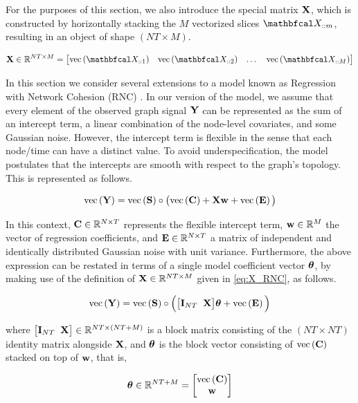 For the purposes of this section, we also introduce the special matrix $\mathbf{X}$, which is constructed by horizontally stacking the $M$ vectorized slices $\Xt_{::m}$, resulting in an object of shape $(NT \times M)$. 

\begin{equation}
    \label{eq:X_RNC}
    \X \in \R^{NT \times M} = \begin{bmatrix} \vecc{\Xt_{::1}} & \vecc{\Xt_{::2}} & \dots & \vecc{\Xt_{::M}} \end{bmatrix}    
\end{equation}

In this section we consider several extensions to a model known as Regression with Network Cohesion (RNC) \citep{Li2019}. In our version of the model, we assume that every element of the observed graph signal $\mathbf{Y}$ can be represented as the sum of an intercept term, a linear combination of the node-level covariates, and some Gaussian noise. However, the intercept term is flexible in the sense that each node/time can have a distinct value. To avoid underspecification, the model postulates that the intercepts are smooth with respect to the graph's topology. This is represented as follows. 

\begin{equation}
    \text{\textup{vec}}\left(\mathbf{Y}\right) = \text{\textup{vec}}\left(\mathbf{S}\right) \circ \big( \text{\textup{vec}}\left(\mathbf{C}\right) + \mathbf{X} \mathbf{w}  + \text{\textup{vec}}\left(\mathbf{E}\right) \big)
\end{equation}

In this context, $\mathbf{C} \in \mathbb{R}^{N \times T}$ represents the flexible intercept term, $\mathbf{w} \in \mathbb{R}^{M}$ the vector of regression coefficients, and $\mathbf{E} \in \mathbb{R}^{N \times T}$ a matrix of independent and identically distributed Gaussian noise with unit variance. Furthermore, the above expression can be restated in terms of a single model coefficient vector $\boldsymbol{\theta}$, by making use of the definition of $\mathbf{X} \in \mathbb{R}^{NT \times M}$ given in \cref{eq:X_RNC}, as follows.

\begin{equation}
    \label{eq:rnc_stat_model_theta}
    \text{\textup{vec}}\left(\mathbf{Y}\right) = \text{\textup{vec}}\left(\mathbf{S}\right) \circ \Big( \big[ \mathbf{I}_{NT} \;\; \mathbf{X} \big]\boldsymbol{\theta}  + \text{\textup{vec}}\left(\mathbf{E}\right) \Big)
\end{equation}

where $\big[ \mathbf{I}_{NT} \;\; \mathbf{X} \big] \in \mathbb{R}^{NT \times (NT + M)}$ is a block matrix consisting of the $(NT \times NT)$ identity matrix alongside $\mathbf{X}$, and $\boldsymbol{\theta}$ is the block vector consisting of $\text{\textup{vec}}\left(\mathbf{C}\right)$ stacked on top of $\mathbf{w}$, that is, 

\begin{equation}
    \boldsymbol{\theta} \in \mathbb{R}^{NT + M} = \begin{bmatrix} \text{\textup{vec}}\left(\mathbf{C}\right) \\ \mathbf{w} \end{bmatrix}
\end{equation}

